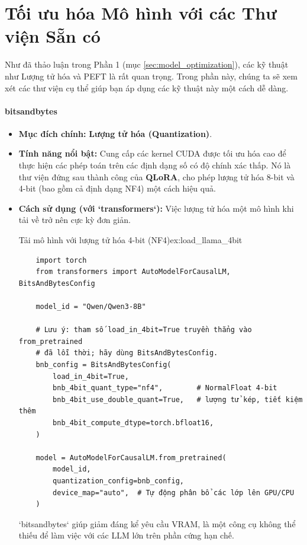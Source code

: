 
\section{Tối ưu hóa Mô hình với các Thư viện Sẵn có}
\label{sec:model_optimization_libraries}
Như đã thảo luận trong Phần 1 (mục \ref{sec:model_optimization}), các kỹ thuật như Lượng tử hóa và PEFT là rất quan trọng. Trong phần này, chúng ta sẽ xem xét các thư viện cụ thể giúp bạn áp dụng các kỹ thuật này một cách dễ dàng.

\paragraph{bitsandbytes}
\begin{itemize}
    \item \textbf{Mục đích chính:} \textbf{Lượng tử hóa (Quantization)}.
    \item \textbf{Tính năng nổi bật:} Cung cấp các kernel CUDA được tối ưu hóa cao để thực hiện các phép toán trên các định dạng số có độ chính xác thấp. Nó là thư viện đứng sau thành công của \textbf{QLoRA}, cho phép lượng tử hóa 8-bit và 4-bit (bao gồm cả định dạng NF4) một cách hiệu quả.
    \item \textbf{Cách sử dụng (với `transformers`):} Việc lượng tử hóa một mô hình khi tải về trở nên cực kỳ đơn giản.
    \begin{example}{Tải mô hình với lượng tử hóa 4-bit (NF4)}{ex:load_llama_4bit}
    \begin{verbatim}
    import torch
    from transformers import AutoModelForCausalLM, BitsAndBytesConfig

    model_id = "Qwen/Qwen3-8B"

    # Lưu ý: tham số load_in_4bit=True truyền thẳng vào from_pretrained
    # đã lỗi thời; hãy dùng BitsAndBytesConfig.
    bnb_config = BitsAndBytesConfig(
        load_in_4bit=True,
        bnb_4bit_quant_type="nf4",        # NormalFloat 4-bit
        bnb_4bit_use_double_quant=True,   # lượng tử kép, tiết kiệm thêm
        bnb_4bit_compute_dtype=torch.bfloat16,
    )

    model = AutoModelForCausalLM.from_pretrained(
        model_id,
        quantization_config=bnb_config,
        device_map="auto",  # Tự động phân bổ các lớp lên GPU/CPU
    )
    \end{verbatim}
    \end{example}
    `bitsandbytes` giúp giảm đáng kể yêu cầu VRAM, là một công cụ không thể thiếu để làm việc với các LLM lớn trên phần cứng hạn chế.
\end{itemize}

